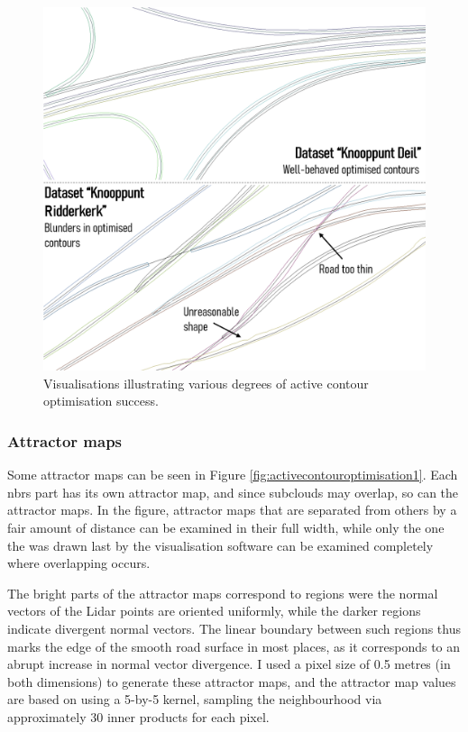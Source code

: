 \begin{figure}[h]
    \centering
    \includegraphics[width=0.84\linewidth]{final_report/figs/activecontouroptimisation0.png}
    \caption{Visualisations illustrating various degrees of active contour optimisation success.}
    \label{fig:activecontouroptimisation0}
\end{figure}

\subsubsection{Attractor maps}

Some attractor maps can be seen in Figure \ref{fig:activecontouroptimisation1}. Each \ac{nbrs} part has its own attractor map, and since subclouds may overlap, so can the attractor maps. In the figure, attractor maps that are separated from others by a fair amount of distance can be examined in their full width, while only the one the was drawn last by the visualisation software can be examined completely where overlapping occurs.

The bright parts of the attractor maps correspond to regions were the normal vectors of the Lidar points are oriented uniformly, while the darker regions indicate divergent normal vectors. The linear boundary between such regions thus marks the edge of the smooth road surface in most places, as it corresponds to an abrupt increase in normal vector divergence. I used a pixel size of 0.5 metres (in both dimensions) to generate these attractor maps, and the attractor map values are based on using a 5-by-5 kernel, sampling the neighbourhood via approximately 30 inner products for each pixel.


